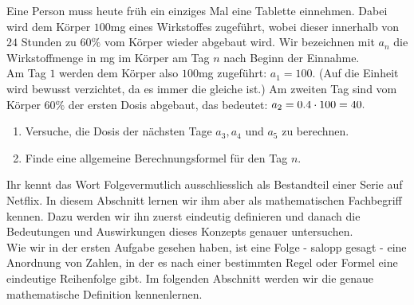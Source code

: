 \documentclass[11pt,oneside]{article}
\begin{document}
	\begin{aufgabe}
		Eine Person muss heute früh ein einziges Mal eine Tablette einnehmen. Dabei wird dem Körper $100$mg eines Wirkstoffes zugeführt, wobei dieser innerhalb von $24$ Stunden zu $60\%$ vom Körper wieder abgebaut wird. Wir bezeichnen mit $a_n$ die Wirkstoffmenge in mg im Körper am Tag $n$ nach Beginn der Einnahme.\\
		Am Tag $1$ werden dem Körper also $100$mg zugeführt: $a_1=100$. (Auf die Einheit wird bewusst verzichtet, da es immer die gleiche ist.) Am zweiten Tag sind vom Körper $60\%$ der ersten Dosis abgebaut, das bedeutet: $a_2=0.4\cdot100=40.$
		\begin{enumerate}[label=\alph*)]
			\item Versuche, die Dosis der nächsten Tage $a_3, a_4$ und $a_5$ zu berechnen.
			\item Finde eine allgemeine Berechnungsformel für den Tag $n$.
		\end{enumerate}
	\end{aufgabe}

	Ihr kennt das Wort \glqq Folge\grqq\:vermutlich ausschliesslich als Bestandteil einer Serie auf Netflix. In diesem Abschnitt lernen wir ihm aber als mathematischen Fachbegriff kennen. Dazu werden wir ihn zuerst eindeutig definieren und danach die Bedeutungen und Auswirkungen dieses Konzepts genauer untersuchen.\\
	Wie wir in der ersten Aufgabe gesehen haben, ist eine Folge - salopp gesagt - eine Anordnung von Zahlen, in der es nach einer bestimmten Regel oder Formel eine eindeutige Reihenfolge gibt. Im folgenden Abschnitt werden wir die genaue mathematische Definition kennenlernen.
	\newpage
\end{document}
